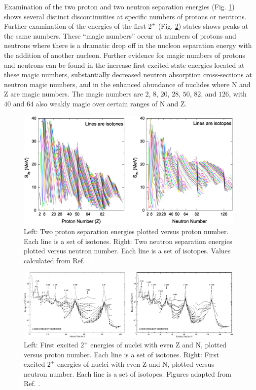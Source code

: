 Examination of the two proton and two neutron separation energies (Fig. \ref{fig:chp2-masses}) shows several distinct discontinuities at specific numbers of protons or neutrons. Further examination of the energies of the first $2^+$ (Fig. \ref{fig:chp2-two-plus-energies}) states shows peaks at the same numbers. These ``magic numbers'' occur at numbers of protons and neutrons where there is a dramatic drop off in the nucleon separation energy with the addition of another nucleon. Further evidence for magic numbers of protons and neutrons can be found in the increase first excited state energies located at these magic numbers, substantially decreased neutron absorption cross-sections at neutron magic numbers, and in the enhanced abundance of nuclides where N and Z are magic numbers. The magic numbers are $2$, $8$, $20$, $28$, $50$, $82$, and $126$, with $40$ and $64$ also weakly magic over certain ranges of N and Z.

\begin{figure}[h!]
\centerline{\includegraphics[width=\textwidth]{./img/c2/2nuc_sep_en.eps}}
	\caption{Left: Two proton separation energies plotted versus proton number. Each line is a set of isotones. Right: Two neutron separation energies plotted versus neutron number. Each line is a set of isotopes. Values calculated from Ref. \cite{AME20031,AME20032}.\label{fig:chp2-masses}}
\end{figure}

\begin{figure}[h!]
\centerline{\includegraphics[width=\textwidth]{./img/c2/2_plus_en.eps}}
	\caption{Left: First excited $2^+$ energies of nuclei with even Z and N, plotted versus proton number. Each line is a set of isotones. Right: First excited $2^+$ energies of nuclei with even Z and N, plotted versus neutron number. Each line is a set of isotopes. Figures adapted from Ref. \cite{RamanTwoPlus}.\label{fig:chp2-two-plus-energies}}
\end{figure}

